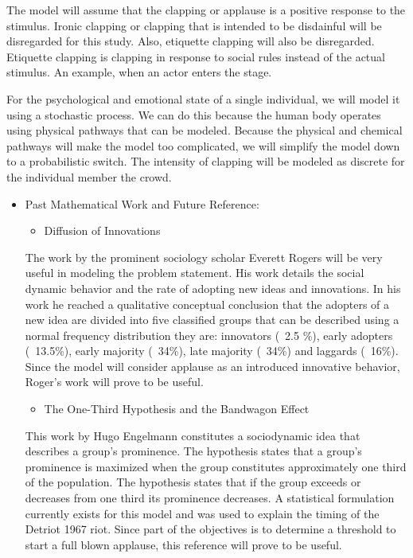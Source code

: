\documentclass[12pt,letterpaper]{article}
\theoremstyle{definition}
\begin{document}
The model will assume that the clapping or applause is a positive response to the stimulus. Ironic clapping or clapping that is intended to be disdainful will be disregarded for this study. Also, etiquette clapping will also be disregarded. Etiquette clapping is clapping in response to social rules instead of the actual stimulus. An example, when an actor enters the stage.

For the psychological and emotional state of a single individual, we will model it using a stochastic process. We can do this because the human body operates using physical pathways that can be modeled. Because the physical and chemical pathways will make the model too complicated, we will simplify the model down to a probabilistic switch. The intensity of clapping will be modeled as discrete for the individual member the crowd. 

\begin{itemize}
\item Past Mathematical Work and Future Reference:
	\begin{itemize}
		\item Diffusion of Innovations 
	\end{itemize}
The work by the prominent sociology scholar Everett Rogers will be very useful in modeling the problem statement. His work details the social dynamic behavior and the rate of adopting new ideas and innovations. In his work he reached a qualitative conceptual conclusion that the adopters of a new idea are divided into five classified groups that can be described using a normal frequency distribution they are: innovators (~2.5 \%), early adopters (~13.5\%), early majority (~34\%), late majority (~34\%) and laggards (~16\%).    Since the model will consider applause as an introduced innovative behavior, Roger’s work will prove to be useful.
	\begin{itemize}
	\item The One-Third Hypothesis and the Bandwagon Effect 
		\end{itemize}
This work by Hugo Engelmann constitutes a sociodynamic idea that describes a group’s prominence. The hypothesis states that a group’s prominence is maximized when the group constitutes approximately one third of the population. The hypothesis states that if the group exceeds or decreases from one third its prominence decreases. A statistical formulation currently exists for this model and was used to explain the timing of the Detriot 1967 riot. Since part of the objectives is to determine a threshold to start a full blown applause, this reference will prove to be useful.

\end{itemize}
\end{document}
